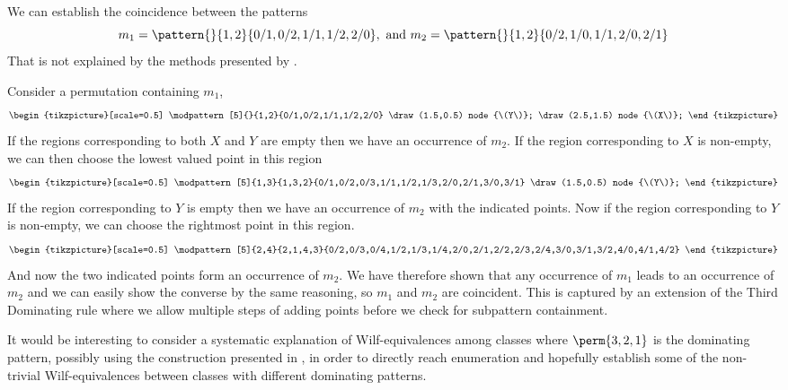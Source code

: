  \begin{example}
   We can establish the coincidence between the patterns
   \begin{equation*}
     m_1 = \pattern{}{1,2}{0/1,0/2,1/1,1/2,2/0}, \text{ and } m_2 = \pattern{}{1,2}{0/2,1/0,1/1,2/0,2/1}
   \end{equation*}
   That is not explained by the methods presented by \textcite{DBLP:journals/corr/ClaessonTU14}.

   Consider a permutation containing \(m_1\),
   \begin{equation*}
     \begin{tikzpicture}[scale=0.5]
         \modpattern[5]{}{1,2}{0/1,0/2,1/1,1/2,2/0}
         \draw (1.5,0.5) node {\(Y\)};
         \draw (2.5,1.5) node {\(X\)};
     \end{tikzpicture}
   \end{equation*}
   If the regions corresponding to both \(X\) and \(Y\) are empty then we have
   an occurrence of \(m_2\).
   If the region corresponding to \(X\) is non-empty, we can then choose
   the lowest valued point in this region
   \begin{equation*}
     \begin{tikzpicture}[scale=0.5]
         \modpattern[5]{1,3}{1,3,2}{0/1,0/2,0/3,1/1,1/2,1/3,2/0,2/1,3/0,3/1}
         \draw (1.5,0.5) node {\(Y\)};
     \end{tikzpicture}
   \end{equation*}
   If the region corresponding to \(Y\) is empty then we have an occurrence of
   \(m_2\) with the indicated points.
   Now if the region corresponding to \(Y\) is non-empty, we can choose the
   rightmost point in this region.
   \begin{equation*}
     \begin{tikzpicture}[scale=0.5]
         \modpattern[5]{2,4}{2,1,4,3}{0/2,0/3,0/4,1/2,1/3,1/4,2/0,2/1,2/2,2/3,2/4,3/0,3/1,3/2,4/0,4/1,4/2}
     \end{tikzpicture}
   \end{equation*}
   And now the two indicated points form an occurrence of \(m_2\).
   We have therefore shown that any occurrence of \(m_1\) leads to an occurrence of
   \(m_2\) and we can easily show the converse by the same reasoning, so \(m_1\)
   and \(m_2\) are coincident.
   This is captured by an extension of the Third Dominating rule where we allow
   multiple steps of adding points before we check for subpattern containment.
 \end{example}

It would be interesting to consider a systematic explanation of Wilf-equivalences among classes
where \(\perm{3,2,1}\) is the dominating pattern, possibly using the  construction presented in
\textcite[Sec.~11]{2015arXiv151203226B}, in order to directly reach enumeration and hopefully establish
some of the non-trivial Wilf-equivalences between classes with different dominating patterns.
